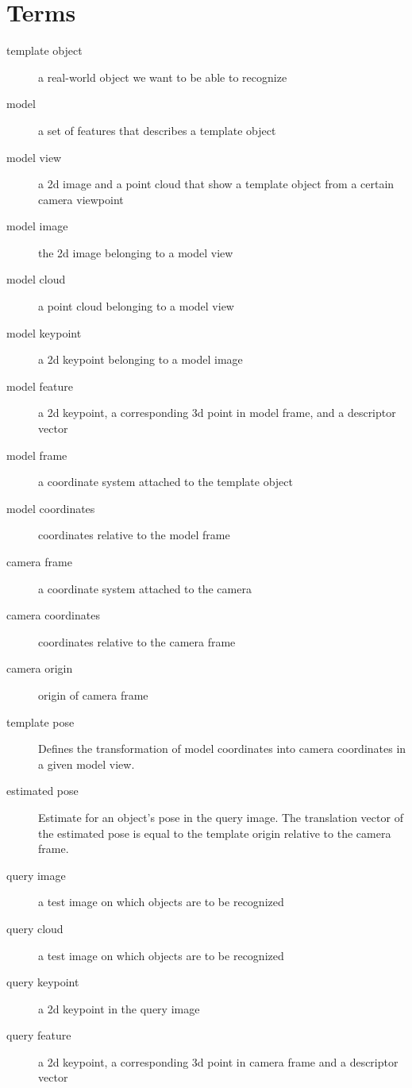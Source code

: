 \chapter{Terms}
\label{chapter:terms}

\begin{description}
    \item[template object] a real-world object we want to be able to recognize
    \item[model] a set of features that describes a template object
    \item[model view] a 2d image and a point cloud that show a template object from a certain camera viewpoint
    \item[model image] the 2d image belonging to a model view
    \item[model cloud] a point cloud belonging to a model view 
    \item[model keypoint] a 2d keypoint belonging to a model image 
    \item[model feature] a 2d keypoint, a corresponding 3d point in model frame, and a descriptor vector
    \item[model frame] a coordinate system attached to the template object 
    \item[model coordinates] coordinates relative to the model frame 
    \item[camera frame] a coordinate system attached to the camera 
    \item[camera coordinates] coordinates relative to the camera frame 
    \item[camera origin] origin of camera frame 
    \item[template pose] Defines the transformation of model coordinates into
        camera coordinates in a given model view. 
    \item[estimated pose] Estimate for an object's pose in the query image. The
        translation vector of the estimated pose is equal to the template origin
        relative to the camera frame.
    \item[query image] a test image on which objects are to be recognized 
    \item[query cloud] a test image on which objects are to be recognized 
    \item[query keypoint] a 2d keypoint in the query image
    \item[query feature] a 2d keypoint, a corresponding 3d point in camera frame and a descriptor vector 
\end{description}



